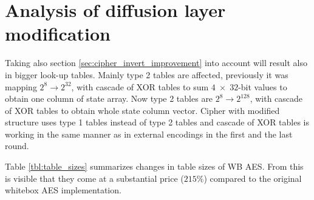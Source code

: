 \documentclass[11pt,oneside,final]{fithesis2}
\begin{document}
    \section{Analysis of diffusion layer modification}
    Taking also section \ref{sec:cipher_invert_improvement} into account will result also in bigger look-up tables. Mainly type 2 tables are affected, previously 
    it was mapping $2^8 \rightarrow 2^{32}$, with cascade of XOR tables to sum $4 \; \times\; 32$-bit values to obtain one column of state array. Now type 2 tables are
    $2^8 \rightarrow 2^{128}$, with cascade of XOR tables to obtain whole state column vector. Cipher with modified structure uses type 1 tables instead of type 2 tables
    and cascade of XOR tables is working in the same manner as in external encodings in the first and the last round.

    Table \ref{tbl:table_sizes} summarizes changes in table sizes of WB AES. From this is visible that
    they come at a substantial price ($215\%$) compared to the original whitebox AES implementation.
    
\end{document}
